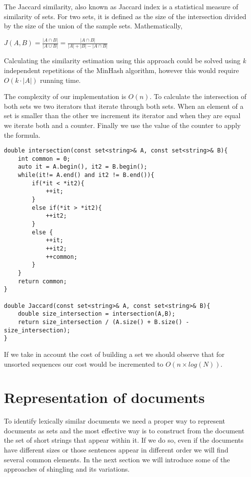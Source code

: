 \documentclass[12pt]{article}
\begin{document}
The Jaccard similarity, also known as Jaccard index is a statistical measure of similarity of sets. For two sets, it is defined as the size of the intersection divided by the size of the union of the sample sets. Mathematically,
\bigbreak
\centerline{\large $J(A,B)=\frac{\left |A\cap B  \right |}{ \left |A\cup B  \right |} = \frac{\left |A\cap B  \right |}{ \left|A\right|+\left|B\right|-\left |A\cap B  \right |} $}
\bigbreak

Calculating the similarity estimation using this approach could be solved using \textit{k} independent repetitions of the MinHash algorithm, however this would require $O(k \cdot |A|)$ running time. 

The complexity of our implementation is $O(n)$. To calculate the intersection of both sets we two iterators that iterate through both sets. When an element of a set is smaller than the other we increment its iterator and when they are equal we iterate both and a counter. Finally we use the value of the counter to apply the formula. 
\lstset{language= C++}
\begin{lstlisting}
double intersection(const set<string>& A, const set<string>& B){
	int common = 0; 
	auto it = A.begin(), it2 = B.begin();
	while(it!= A.end() and it2 != B.end()){
		if(*it < *it2){
			++it;
		}
		else if(*it > *it2){
			++it2;
		}
		else {
			++it;
			++it2;
			++common;
		}
	}
	return common; 
}

double Jaccard(const set<string>& A, const set<string>& B){
	double size_intersection = intersection(A,B);
	return size_intersection / (A.size() + B.size() - size_intersection);
}

\end{lstlisting}

If we take in account the cost of building a set we should observe that for unsorted sequences our cost would be incremented to $O(n \times log(N))$.


\section{Representation of documents}

To identify lexically similar documents we need a proper way to represent documents as sets and the most effective way is to construct from the document the set of short strings that appear within it. If we do so, even if the documents have different sizes or those sentences appear in different order we will find several common elements. In the next section we will introduce some of the approaches of shingling and its variations.
\end{document}
